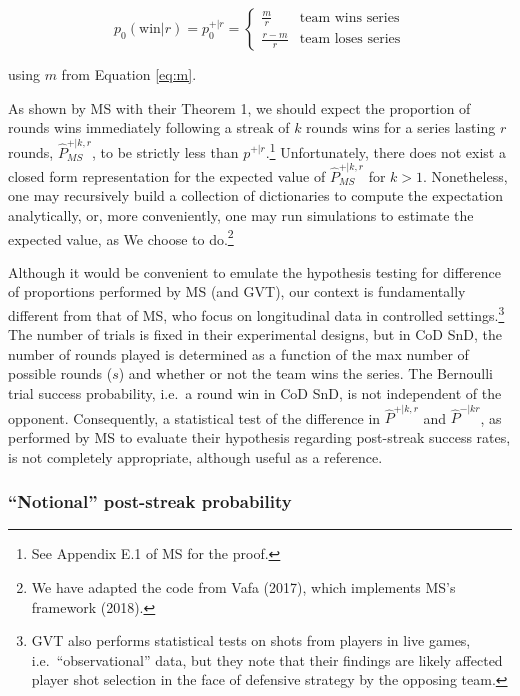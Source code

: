 \documentclass{article}
\begin{document}
\begin{equation}\label{eq:pwr}
p_0(\text{win} | r) = p^{+|r}_0 = \begin{cases} 
\frac{m}{r} & \text{team wins series} \\ 
\frac{r - m}{r} & \text{team loses series}  
\end{cases}
\end{equation}

using \(m\) from Equation \ref{eq:m}.

As shown by MS with their Theorem 1, we should expect the proportion of
rounds wins immediately following a streak of \(k\) rounds wins for a
series lasting \(r\) rounds, \(\hat{P}^{+|k,r}_{MS}\), to be strictly
less than \(p^{+|r}\).\footnote{See Appendix E.1 of MS for the proof.}
Unfortunately, there does not exist a closed form representation for the
expected value of \(\hat{P}^{+|k,r}_{MS}\) for \(k > 1\). Nonetheless,
one may recursively build a collection of dictionaries to compute the
expectation analytically, or, more conveniently, one may run simulations
to estimate the expected value, as We choose to do.\footnote{We have
  adapted the code from Vafa (2017), which implements MS's framework
  (2018).}

Although it would be convenient to emulate the hypothesis testing for
difference of proportions performed by MS (and GVT), our context is
fundamentally different from that of MS, who focus on longitudinal data
in controlled settings.\footnote{GVT also performs statistical tests on
  shots from players in live games, i.e.~``observational'' data, but
  they note that their findings are likely affected player shot
  selection in the face of defensive strategy by the opposing team.} The
number of trials is fixed in their experimental designs, but in CoD SnD,
the number of rounds played is determined as a function of the max
number of possible rounds (\(s\)) and whether or not the team wins the
series. The Bernoulli trial success probability, i.e.~a round win in CoD
SnD, is not independent of the opponent. Consequently, a statistical
test of the difference in \(\hat{P}^{+|k,r}\) and \(\hat{P}^{-|kr}\), as
performed by MS to evaluate their hypothesis regarding post-streak
success rates, is not completely appropriate, although useful as a
reference.

\hypertarget{notional-post-streak-probability}{%
\subsubsection{``Notional'' post-streak
probability}\label{notional-post-streak-probability}}
\end{document}

